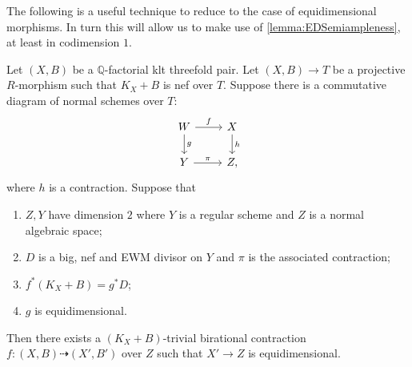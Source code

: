 \documentclass[a4paper,12pt]{book}
\begin{document}
	The following is a useful technique to reduce to the case of equidimensional morphisms. In turn this will allow us to make use of \autoref{lemma:EDSemiampleness}, at least in codimension $1$.
	
	\begin{proposition}\label{three}
		Let $(X,B)$ be a $\mathbb{Q}$-factorial klt threefold pair.
		Let $(X,B) \to T$ be a projective $R$-morphism such that $K_{X}+B$ is nef over $T$. Suppose there is a commutative diagram of normal schemes over $T$:
		\[\begin{tikzcd}
		W \arrow[d, "g"] \arrow[r, "f"] & X \arrow[d, "h"]  \\
		Y     \arrow[r, "\pi"]           & Z,              
		\end{tikzcd}\]
		where $h$ is a contraction. Suppose  that 
		\begin{enumerate}
			\item  $Z,Y$ have dimension $2$ where $Y$ is a regular scheme and $Z$ is a normal algebraic space;
			\item $D$ is a big, nef and EWM divisor on $Y$ and $\pi$ is the associated contraction;
			\item  $f^{*}(K_{X}+B)=g^{*}D$;
			\item $g$ is equidimensional. 
		\end{enumerate} 
		
		Then there exists a $(K_X+B)$-trivial birational contraction $f \colon (X,B) \dashrightarrow (X', B')$ over $Z$ such that $X' \to Z$ is equidimensional. 
	\end{proposition}
\end{document}
